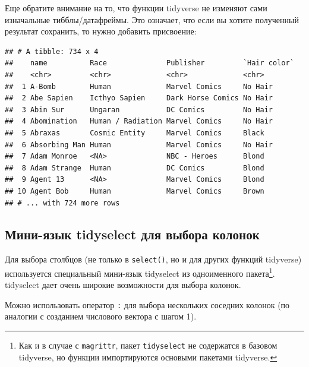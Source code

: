 \documentclass[]{book}
\newenvironment{Shaded}{\begin{snugshade}}{\end{snugshade}}
\newcommand{\KeywordTok}[1]{\textcolor[rgb]{0.13,0.29,0.53}{\textbf{#1}}}
\newcommand{\DataTypeTok}[1]{\textcolor[rgb]{0.13,0.29,0.53}{#1}}
\newcommand{\StringTok}[1]{\textcolor[rgb]{0.31,0.60,0.02}{#1}}
\newcommand{\OperatorTok}[1]{\textcolor[rgb]{0.81,0.36,0.00}{\textbf{#1}}}
\newcommand{\NormalTok}[1]{#1}
\begin{document}
Еще обратите внимание на то, что функции tidyverse не изменяют сами
изначальные тибблы/датафреймы. Это означает, что если вы хотите
полученный результат сохранить, то нужно добавить присвоение:

\begin{Shaded}
\end{Shaded}

\begin{verbatim}
## # A tibble: 734 x 4
##    name          Race              Publisher         `Hair color`
##    <chr>         <chr>             <chr>             <chr>       
##  1 A-Bomb        Human             Marvel Comics     No Hair     
##  2 Abe Sapien    Icthyo Sapien     Dark Horse Comics No Hair     
##  3 Abin Sur      Ungaran           DC Comics         No Hair     
##  4 Abomination   Human / Radiation Marvel Comics     No Hair     
##  5 Abraxas       Cosmic Entity     Marvel Comics     Black       
##  6 Absorbing Man Human             Marvel Comics     No Hair     
##  7 Adam Monroe   <NA>              NBC - Heroes      Blond       
##  8 Adam Strange  Human             DC Comics         Blond       
##  9 Agent 13      <NA>              Marvel Comics     Blond       
## 10 Agent Bob     Human             Marvel Comics     Brown       
## # ... with 724 more rows
\end{verbatim}

\subsection{Мини-язык tidyselect для выбора колонок}\label{tidyselect}

Для выбора столбцов (не только в \texttt{select()}, но и для других
функций tidyverse) используется специальный мини-язык tidyselect из
одноименного пакета\footnote{Как и в случае с \texttt{magrittr}, пакет
  \texttt{tidyselect} не содержатся в базовом tidyverse, но функции
  импортируются основыми пакетами tidyverse.}. tidyselect дает очень
широкие возможности для выбора колонок.

Можно использовать оператор \texttt{:} для выбора нескольких соседних
колонок (по аналогии с созданием числового вектора с шагом 1).
\end{document}
